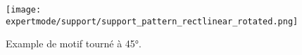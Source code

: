 \begin{figure}[H]
\centering
\texttt{[image: expertmode/support/support\_pattern\_rectlinear\_rotated.png]}
\caption{Example de motif tourn\'e \`a 45°.}
\label{fig:support_pattern_rectlinear_rotated}
\end{figure}




